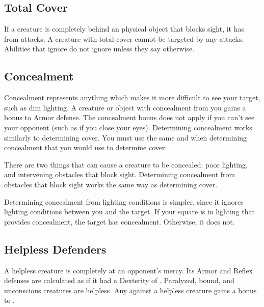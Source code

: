     \subsection{Total Cover}\label{Total Cover}
        If a creature is completely behind an physical object that blocks sight, it has  from attacks.
        A creature with total cover cannot be targeted by any attacks.
        Abilities that ignore  do not ignore  unless they say otherwise.

    \subsection{Concealment}\label{Concealment}
        Concealment represents anything which makes it more difficult to see your target, such as dim lighting.
        A creature or object with concealment from you gains a  bonus to Armor defense.
        The concealment bonus does not apply if you can't see your opponent (such as if you close your eyes).
        Determining concealment works similarly to determining cover.
        You must use the same  and  when determining concealment that you would use to determine cover.

         There are two things that can cause a creature to be concealed: poor lighting, and intervening obstacles that block sight.
        Determining concealment from obstacles that block sight works the same way as determining cover.

        Determining concealment from lighting conditions is simpler, since it ignores lighting conditions between you and the target.
        If your  square is in lighting that provides concealment, the target has concealment.
        Otherwise, it does not.

    \subsection{Helpless Defenders}
        A helpless creature is completely at an opponent's mercy.
        Its Armor and Reflex defenses are calculated as if it had a Dexterity of .
        Paralyzed, bound, and unconscious creatures are helpless.
        Any  against a helpless creature gains a  bonus to .

